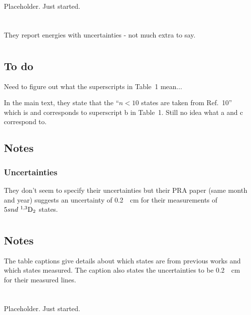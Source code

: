 \documentclass{article}
\newcommand{\tsup}{\textsuperscript}													%
\newcommand{\tsub}{\textsubscript}														%
\newcommand{\SLJ}[3]{\tsup{#1}\textnormal{#2}\tsub{#3}}
\newcommand{\nSLJ}[4]{{#1}\textnormal{ }\SLJ{#2}{#3}{#4}}
\begin{document}
\section{}

Placeholder. Just started.

\section{}

They report energies with uncertainties - not much extra to say.

\section{}

\subsection{To do}

Need to figure out what the superscripts in Table~1 mean...

In the main text, they state that the ``${n < 10}$ states are taken from Ref.~10'' which is \cite{moo_1952v2} and corresponds to superscript b in Table~1. Still no idea what a and c correspond to.

\subsection{Notes}

\subsubsection{Uncertainties}

They don't seem to specify their uncertainties but their PRA paper \cite{daz_1995} (same month and year) suggests an uncertainty of \SI{0.2}{\per\cm} for their measurements of $\nSLJ{5snd}{1,3}{D}{2}$ states. 

\section{}

\subsection{Notes}

The table captions give details about which states are from previous works and which states \citeauthor{dai_1995} measured. The caption also states the uncertainties to be \SI{0.2}{\per\cm} for their measured lines.

\section{}

Placeholder. Just started.

\printbibliography
\end{document}

